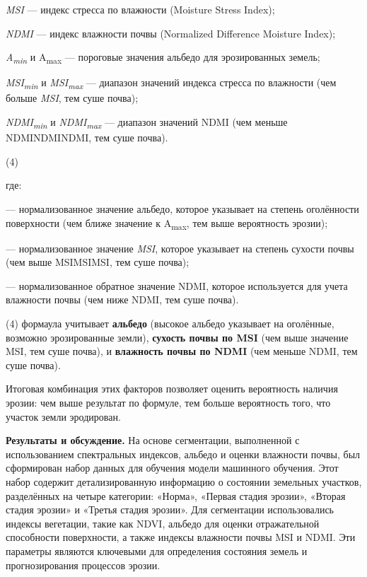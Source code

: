 \emph{MSI} --- индекс стресса по влажности (Moisture Stress Index);

\emph{NDMI} --- индекс влажности почвы (Normalized Difference Moisture
Index);

\emph{A\textsubscript{min }}и A\textsubscript{max} --- пороговые
значения альбедо для эрозированных земель;

\emph{MSI\textsubscript{min }}и \emph{MSI\textsubscript{max}} ---
диапазон значений индекса стресса по влажности (чем больше \emph{MSI},
тем суше почва);

\emph{NDMI\textsubscript{min }}и \emph{NDMI\textsubscript{max}} ---
диапазон значений NDMI (чем меньше NDMINDMINDMI, тем суше почва).

(4)

где:

---
нормализованное значение альбедо, которое указывает на степень
оголённости поверхности (чем ближе значение к A\textsubscript{max}, тем
выше вероятность эрозии);

---
нормализованное значение \emph{MSI}, которое указывает на степень
сухости почвы (чем выше MSIMSIMSI, тем суше почва);

---
нормализованное обратное значение NDMI, которое используется для учета
влажности почвы (чем ниже NDMI, тем суше почва).

(4) формаула учитывает {\bfseries альбедо} (высокое альбедо указывает на
оголённые, возможно эрозированные земли), {\bfseries сухость почвы по MSI}
(чем выше значение MSI, тем суше почва), и {\bfseries влажность почвы по
NDMI} (чем меньше NDMI, тем суше почва).

Итоговая комбинация этих факторов позволяет оценить вероятность наличия
эрозии: чем выше результат по формуле, тем больше вероятность того, что
участок земли эродирован.

{\bfseries Результаты и обсуждение.} На основе сегментации, выполненной с
использованием спектральных индексов, альбедо и оценки влажности почвы,
был сформирован набор данных для обучения модели машинного обучения.
Этот набор содержит детализированную информацию о состоянии земельных
участков, разделённых на четыре категории: «Норма», «Первая стадия
эрозии», «Вторая стадия эрозии» и «Третья стадия эрозии». Для
сегментации использовались индексы вегетации, такие как NDVI, альбедо
для оценки отражательной способности поверхности, а также индексы
влажности почвы MSI и NDMI. Эти параметры являются ключевыми для
определения состояния земель и прогнозирования процессов эрозии.

